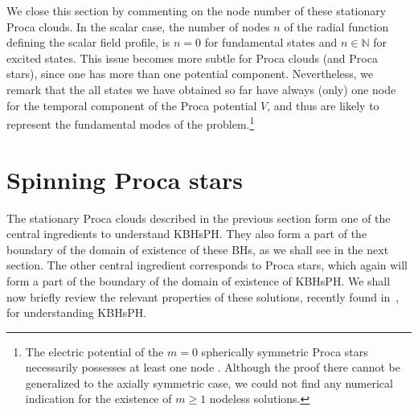 We close this section by commenting on the node number of these stationary Proca clouds. 
In the scalar case, the number of nodes $n$ of the radial function defining the scalar field profile, 
is $n=0$ for fundamental states and $n\in \mathbb{N}$ for excited states. 
This issue becomes more subtle for Proca clouds (and Proca stars), 
since one has more than one potential component. Nevertheless, we remark that the all states we have obtained so far have always (only)
one node for the temporal component of the Proca potential  $V$, and thus are likely to represent the fundamental
modes of the problem.\footnote{The electric potential of the $m=0$ 
spherically symmetric Proca stars necessarily possesses at least one node \cite{Brito:2015pxa}.
Although the proof there cannot be generalized to the axially symmetric case,
we could not find any numerical indication for the existence of $m\geq 1$ nodeless solutions. 
}

 

\section{Spinning Proca stars} 
\label{sec_stars}
The stationary Proca clouds described in the previous section form one of the central ingredients to understand KBHsPH. They also form a part of the boundary of the domain of existence of these BHs, as we shall see in the next section. The other central ingredient corresponds to Proca stars, which again will form a part of the boundary of the domain of existence of KBHsPH. We shall now briefly review the relevant properties of these solutions, recently found in~\cite{Brito:2015pxa}, for understanding KBHsPH.

